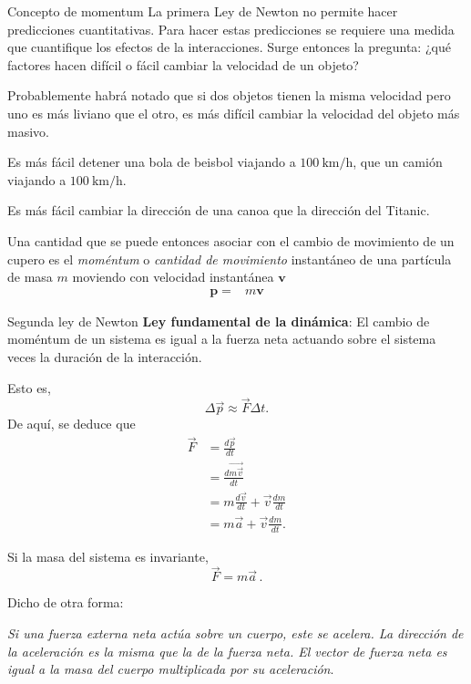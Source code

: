 \begin{frame}{Concepto de momentum}
    La primera Ley de Newton no permite hacer predicciones cuantitativas. Para hacer estas predicciones se requiere una medida que cuantifique los efectos de la interacciones. Surge entonces la pregunta: ¿qué factores hacen difícil o fácil cambiar la velocidad de un objeto?

\vspace{1em} Probablemente habrá notado que si dos objetos tienen la misma velocidad pero uno es más liviano que el otro, es más difícil cambiar la velocidad del objeto más masivo. 

\vspace{1em}  Es más fácil detener una bola de beisbol viajando a $\SI{100}{\kilo\meter\per\hour}$, que un camión viajando a $\SI{100}{\kilo\meter\per\hour}$.

Es más fácil cambiar la dirección de una canoa que la dirección del Titanic.

\vspace{1em} Una cantidad que se puede entonces asociar con el cambio de movimiento de un cupero es el \emph{moméntum} o \emph{cantidad de movimiento} instantáneo de una partícula de masa $m$ moviendo con velocidad instantánea $\mathbf{v}$
\begin{align}
  \mathbf{p}=&m \mathbf{v}
\end{align}
\end{frame}

\begin{frame}{Segunda ley de Newton}
    \textbf{Ley fundamental de la dinámica}: El cambio de moméntum de un sistema es igual a la fuerza neta actuando sobre el sistema veces la duración de la interacción.

    Esto es, \begin{equation*}
        \Delta\vec{p}\approx\vec{F}\Delta t.
    \end{equation*} De aquí, se deduce que \begin{align*}
        \vec{F}&=\frac{d\vec{p}}{dt}\\&=\frac{d\vec{m\vec{v}}}{dt}\\&=m\frac{d\vec{v}}{dt}+\vec{v}\frac{dm}{dt}\\&=m\vec{a}+\vec{v}\frac{dm}{dt}.
    \end{align*}
\end{frame}

\begin{frame}
Si la masa del sistema es invariante, \begin{equation}
        \boxed{\vec{F}=m\vec{a}}\,.
    \end{equation}

    Dicho de otra forma:
    \begin{center}
        \textit{Si una fuerza externa neta actúa
sobre un cuerpo, este se acelera. La dirección de la aceleración es la misma que la
de la fuerza neta. El vector de fuerza neta es igual a la masa del cuerpo multiplicada
por su aceleración}.
    \end{center}
\end{frame}

